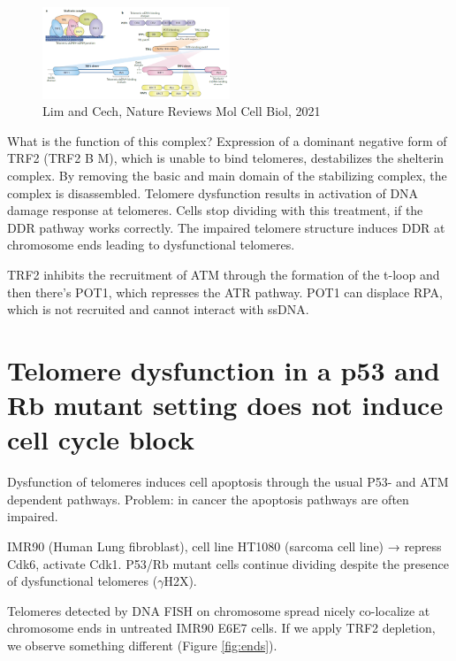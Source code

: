 \begin{figure}
\centering
\includegraphics[width=0.5\textwidth]{../_resources/Screen_Shot_2022-12-15_at_17-43-24.png}
\caption{Lim and Cech, Nature Reviews Mol Cell Biol, 2021}
\label{fig:shelt}
\end{figure}

What is the function of this complex? Expression of a dominant negative
form of TRF2 (TRF2 B M), which is unable to bind telomeres, destabilizes
the shelterin complex. By removing the basic and main domain of the
stabilizing complex, the complex is disassembled. Telomere dysfunction
results in activation of DNA damage response at telomeres. Cells stop
dividing with this treatment, if the DDR pathway works correctly. The
impaired telomere structure induces DDR at chromosome ends leading to
dysfunctional telomeres.

TRF2 inhibits the recruitment of ATM through the formation of the t-loop
and then there's POT1, which represses the ATR pathway. POT1 can
displace RPA, which is not recruited and cannot interact with ssDNA.

\hypertarget{telomere-dysfunction-in-a-p53-and-rb-mutant-setting-does-not-induce-cell-cycle-block}{%
\section{Telomere dysfunction in a p53 and Rb mutant setting does not induce cell cycle block}\label{telomere-dysfunction-in-a-p53-and-rb-mutant-setting-does-not-induce-cell-cycle-block}}

Dysfunction of telomeres induces cell apoptosis through the usual P53-
and ATM dependent pathways. Problem: in cancer the apoptosis pathways
are often impaired.

IMR90 (Human Lung fibroblast), cell line HT1080 (sarcoma cell line) →
repress Cdk6, activate Cdk1. P53/Rb mutant cells continue dividing
despite the presence of dysfunctional telomeres ($\gamma$H2X).

Telomeres detected by DNA FISH on chromosome spread nicely co-localize
at chromosome ends in untreated IMR90 E6E7 cells. If we apply TRF2
depletion, we observe something different (Figure \ref{fig:ends}).

